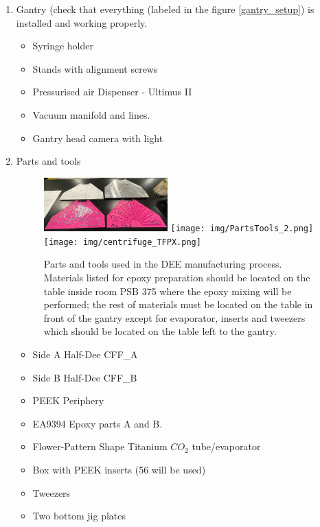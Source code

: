 \documentclass[12pt]{cornelltfpxsop}
\begin{document}
\begin{enumerate}

\item Gantry (check that everything (labeled in the figure  \ref{gantry_setup}) is installed and working properly. 
    \begin{itemize}
        \item Syringe holder 
        \item Stands with alignment screws
        \item Pressurised air Dispenser - Ultimus II
        \item Vacuum manifold and lines.
        \item Gantry head camera with light
    \end{itemize}
\item Parts and tools
\begin{center}
\begin{figure}[h]
\includegraphics[width=0.45\textwidth,angle = 0]{img/PartsTools_1.png}
\texttt{[image: img/PartsTools\_2.png]}\\
\texttt{[image: img/centrifuge\_TFPX.png]}
\caption{Parts and tools used in the DEE manufacturing process. Materials listed for epoxy preparation should be located on the table inside room PSB 375 where the epoxy mixing will be performed; the rest of materials must be located on the table in front of the gantry except for evaporator, inserts and tweezers which should be located on the table left to the gantry.}
\label{Parts ands tools}
\end{figure}
\end{center}
    \begin{itemize}
        \item Side A Half-Dee CFF\_A 
        \item Side B Half-Dee CFF\_B
        \item PEEK Periphery
        \item EA9394 Epoxy  parts A and B. 
        \item Flower-Pattern Shape Titanium $CO_2$ tube/evaporator
        \item Box with PEEK inserts (56 will be used)
        \item Tweezers
        \item Two bottom jig plates

\end{itemize}
\end{enumerate}
\end{document}
